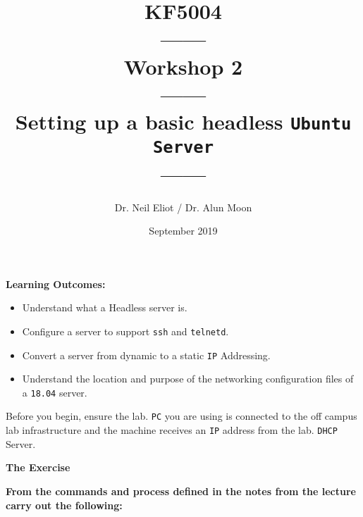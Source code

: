 \documentclass[11pt]{article}
\begin{document}
\author{Dr. Neil Eliot / Dr. Alun Moon}
\title{KF5004\\------\\Workshop 2\\------\\Setting up a basic headless \texttt{Ubuntu Server}\\------}
\date{September 2019}
\maketitle

\newpage



\noindent\textbf{Learning Outcomes:}
\begin{itemize}
    \item Understand what a Headless server is.
    \item Configure a server to support \texttt{ssh} and \texttt{telnetd}.
    \item Convert a server from dynamic to a static \texttt{IP} Addressing.
    \item Understand the location and purpose of the networking configuration files of a \texttt{18.04} server.
\end{itemize}


\begin{tcolorbox}[title={\textbf{Important:}}]
    Before you begin, ensure the lab. \texttt{PC} you are using is connected to the off campus lab infrastructure and the machine receives an \texttt{IP} address from the lab. \texttt{DHCP} Server.
\end{tcolorbox}
\newpage

\noindent\textbf{The Exercise}\\
\begin{tcolorbox}[colback=blue!20]
    \noindent\textbf{From the commands and process defined in the notes from the lecture carry out the following:}
\end{tcolorbox}
\end{document}
